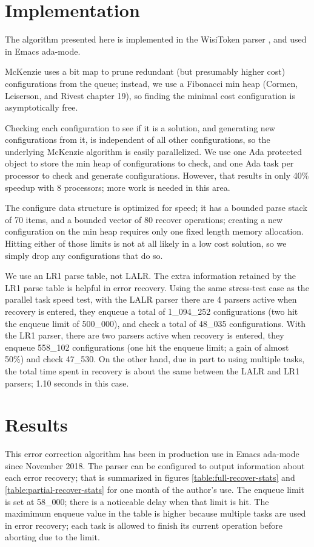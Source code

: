 \documentclass[authordraft]{acmart}
\begin{document}
\section{Implementation}
The algorithm presented here is implemented in the WisiToken parser
\citep{wisitoken}, and used in Emacs ada-mode.

McKenzie uses a bit map to prune redundant (but presumably higher
cost) configurations from the queue; instead, we use a Fibonacci min
heap (Cormen, Leiserson, and Rivest \citet{algorithms 2009} chapter
19), so finding the minimal cost configuration is asymptotically free.

Checking each configuration to see if it is a solution, and generating
new configurations from it, is independent of all other
configurations, so the underlying McKenzie algorithm is easily
parallelized. We use one Ada protected object to store the min heap of
configurations to check, and one Ada task per processor to check and
generate configurations. However, that results in only 40\% speedup
with 8 processors; more work is needed in this area.

The configure data structure is optimized for speed; it has a bounded
parse stack of 70 items, and a bounded vector of 80 recover
operations; creating a new configuration on the min heap requires only
one fixed length memory allocation. Hitting either of those limits is
not at all likely in a low cost solution, so we simply drop any
configurations that do so.

We use an LR1 parse table, not LALR. The extra information retained by
the LR1 parse table is helpful in error recovery. Using the same
stress-test case as the parallel task speed test, with the LALR parser
there are 4 parsers active when recovery is entered, they enqueue a
total of 1\_094\_252 configurations (two hit the enqueue limit of
500\_000), and check a total of 48\_035 configurations. With the LR1
parser, there are two parsers active when recovery is entered, they
enqueue 558\_102 configurations (one hit the enqueue limit; a gain of
almost 50\%) and check 47\_530. On the other hand, due in part to
using multiple tasks, the total time spent in recovery is about the
same between the LALR and LR1 parsers; 1.10 seconds in this case.

\section{Results}
This error correction algorithm has been in production use in Emacs
ada-mode since November 2018. The parser can be configured to output
information about each error recovery; that is summarized in figures
\ref{table:full-recover-stats} and \ref{table:partial-recover-stats} for
one month of the author's use. The enqueue limit is set at 58\_000;
there is a noticeable delay when that limit is hit. The maximimum
enqueue value in the table is higher because multiple tasks are used
in error recovery; each task is allowed to finish its current
operation before aborting due to the limit.
\end{document}

